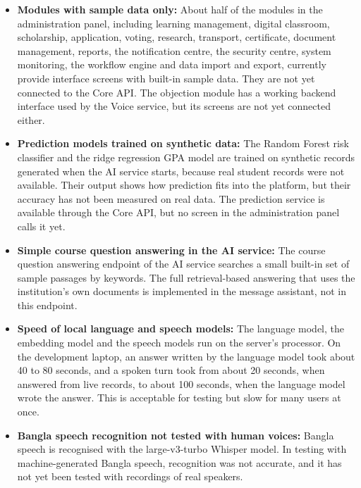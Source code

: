 \begin{itemize}
    \item \textbf{Modules with sample data only:} About half of the modules in the administration panel, including learning management, digital classroom, scholarship, application, voting, research, transport, certificate, document management, reports, the notification centre, the security centre, system monitoring, the workflow engine and data import and export, currently provide interface screens with built-in sample data. They are not yet connected to the Core API. The objection module has a working backend interface used by the Voice service, but its screens are not yet connected either.

    \item \textbf{Prediction models trained on synthetic data:} The Random Forest risk classifier and the ridge regression GPA model are trained on synthetic records generated when the AI service starts, because real student records were not available. Their output shows how prediction fits into the platform, but their accuracy has not been measured on real data. The prediction service is available through the Core API, but no screen in the administration panel calls it yet.

    \item \textbf{Simple course question answering in the AI service:} The course question answering endpoint of the AI service searches a small built-in set of sample passages by keywords. The full retrieval-based answering that uses the institution's own documents is implemented in the message assistant, not in this endpoint.

    \item \textbf{Speed of local language and speech models:} The language model, the embedding model and the speech models run on the server's processor. On the development laptop, an answer written by the language model took about 40 to 80 seconds, and a spoken turn took from about 20 seconds, when answered from live records, to about 100 seconds, when the language model wrote the answer. This is acceptable for testing but slow for many users at once.

    \item \textbf{Bangla speech recognition not tested with human voices:} Bangla speech is recognised with the large-v3-turbo Whisper model. In testing with machine-generated Bangla speech, recognition was not accurate, and it has not yet been tested with recordings of real speakers.


\end{itemize}
